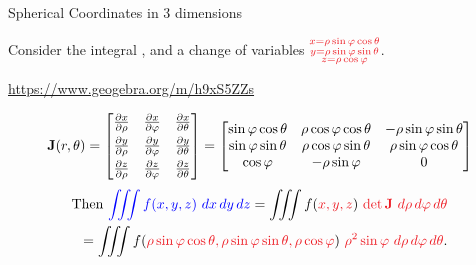 \documentclass[xcolor=dvipsnames,aspectratio=169,t]{beamer}
\begin{document}
\begin{frame}{Spherical Coordinates in 3 dimensions}
  \bigskip
  
  \def\phi{\varphi}  %
  
  Consider the integral , 
  and a change of variables $\colorr{\substack{x=\rho \sin\phi \cos\theta \\ y=\rho \sin\phi \sin\theta \\ z = \rho \cos\phi}}$.
  \medskip
  
  \url{https://www.geogebra.org/m/h9xS5ZZs}
  \medskip
  
  \pause
  \[
    \displaystyle
    \mathbf{J}(r,\theta)
      =\begin{bmatrix}
        \frac{\partial x}{\partial \rho} & \frac{\partial x}{\partial \phi} & \frac{\partial x}{\partial \theta} \smallskip\\
        \frac{\partial y}{\partial \rho} & \frac{\partial y}{\partial \phi} & \frac{\partial y}{\partial \theta} \smallskip\\
        \frac{\partial z}{\partial \rho} & \frac{\partial z}{\partial \phi} & \frac{\partial z}{\partial \theta}
       \end{bmatrix}
      =\begin{bmatrix}
        \sin\phi \cos\theta & \rho \cos\phi \cos\theta & -\rho \sin\phi \sin\theta \\
        \sin\phi \sin\theta & \rho \cos\phi \sin\theta &  \rho \sin\phi \cos\theta \\
        \cos\phi            &-\rho \sin\phi            &  0
       \end{bmatrix}
  \]
  \pause
  \begin{align*}
    \text{Then } \colorb{\iiint f(x,y,z) \ dx\,dy\,dz}
      =\iiint f(\colorr{x,y,z}) \ \colorr{\det \mathbf{J}\ d\rho\, d\phi\, d\theta} \\
      =\iiint f(\colorr{\rho \sin\phi \cos\theta,\rho \sin\phi \sin\theta,\rho \cos\phi}) \ \colorr{\rho^2 \sin\phi \ d\rho\, d\phi\, d\theta}.
  \end{align*}
\end{frame}
\end{document}
